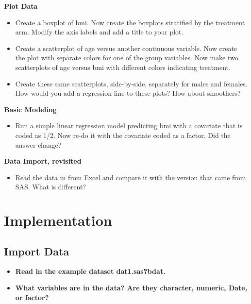 \documentclass[
]{book}
\providecommand{\tightlist}{%
  \setlength{\itemsep}{0pt}\setlength{\parskip}{0pt}}
\begin{document}
\textbf{Plot Data}

\begin{itemize}
\tightlist
\item
  Create a boxplot of bmi. Now create the boxplots stratified by the treatment arm. Modify the axis labels and add a title to your plot.
\item
  Create a scatterplot of age versus another continuous variable. Now create the plot with separate colors for one of the group variables. Now make two scatterplots of age versus bmi with different colors indicating treatment.
\item
  Create these same scatterplots, side-by-side, separately for males and females. How would you add a regression line to these plots? How about smoothers?
\end{itemize}

\textbf{Basic Modeling}

\begin{itemize}
\tightlist
\item
  Run a simple linear regression model predicting bmi with a covariate that is coded as 1/2.
  Now re-do it with the covariate coded as a factor. Did the answer change?
\end{itemize}

\textbf{Data Import, revisited}

\begin{itemize}
\tightlist
\item
  Read the data in from Excel and compare it with the version that came from SAS. What is different?
\end{itemize}

\hypertarget{implementation}{%
\section{Implementation}\label{implementation}}

\hypertarget{import-data}{%
\subsection{Import Data}\label{import-data}}

\begin{itemize}
\tightlist
\item
  \textbf{Read in the example dataset dat1.sas7bdat.}
\item
  \textbf{What variables are in the data? Are they character, numeric, Date, or factor? }
\end{itemize}
\end{document}
